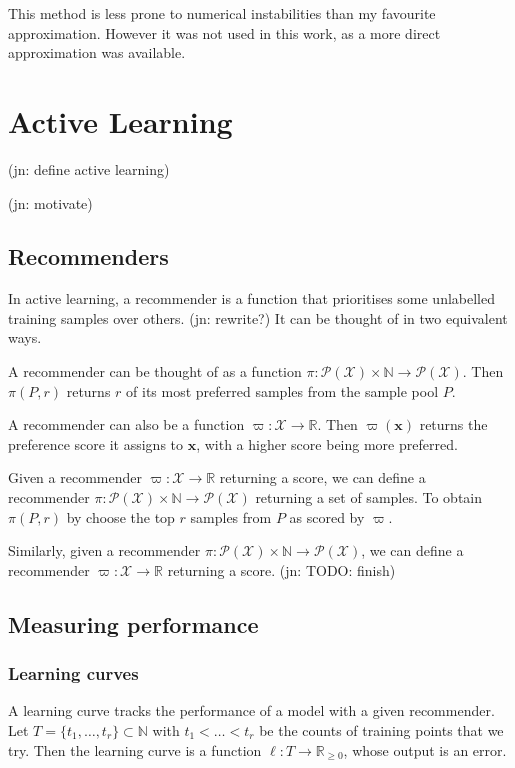 \documentclass[11pt,twoside]{report}
\newcommand\bbN{\mathbb{N}}
\newcommand\bbR{\mathbb{R}}
\newcommand\bx{\mathbf{x}}
\newcommand\cP{\mathcal{P}}
\newcommand\cX{\mathcal{X}}
\newcommand\jn[1]{{\color{red}(jn: #1)}}
\begin{document}
This method is less prone to numerical instabilities than my favourite approximation. However it was not used in this work, as a more direct approximation was available.


\chapter{Active Learning}

\jn{define active learning}

\jn{motivate}

\section{Recommenders}

In active learning, a recommender is a function that prioritises some unlabelled training samples over others. \jn{rewrite?} It can be thought of in two equivalent ways.

A recommender can be thought of as a function $\pi : \cP(\cX) \times \bbN \to \cP(\cX)$. Then $\pi(P, r)$ returns $r$ of its most preferred samples from the sample pool $P$.

A recommender can also be a function $\varpi : \cX \to \bbR$. Then $\varpi(\bx)$ returns the preference score it assigns to $\bx$, with a higher score being more preferred.

Given a recommender $\varpi : \cX \to \bbR$ returning a score, we can define a recommender $\pi : \cP(\cX) \times \bbN \to \cP(\cX)$ returning a set of samples. To obtain $\pi(P, r)$ by choose the top $r$ samples from $P$ as scored by $\varpi$.

Similarly, given a recommender $\pi : \cP(\cX) \times \bbN \to \cP(\cX)$, we can define a recommender $\varpi : \cX \to \bbR$ returning a score. \jn{TODO: finish}



\section{Measuring performance}

\subsection{Learning curves}
A learning curve tracks the performance of a model with a given recommender. Let $T = \{t_1, \dots, t_r\} \subset \bbN$ with $t_1 < \dots < t_r$ be the counts of training points that we try. Then the learning curve is a function $\ell : T \to \bbR_{\geq0}$, whose output is an error.
\end{document}
